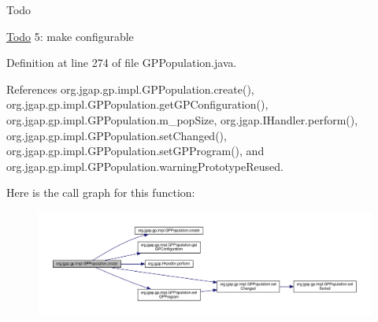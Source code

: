 \begin{DoxyRefDesc}{Todo}
\item[\hyperlink{todo__todo000156}{Todo}]5\-: make configurable \end{DoxyRefDesc}


Definition at line 274 of file G\-P\-Population.\-java.



References org.\-jgap.\-gp.\-impl.\-G\-P\-Population.\-create(), org.\-jgap.\-gp.\-impl.\-G\-P\-Population.\-get\-G\-P\-Configuration(), org.\-jgap.\-gp.\-impl.\-G\-P\-Population.\-m\-\_\-pop\-Size, org.\-jgap.\-I\-Handler.\-perform(), org.\-jgap.\-gp.\-impl.\-G\-P\-Population.\-set\-Changed(), org.\-jgap.\-gp.\-impl.\-G\-P\-Population.\-set\-G\-P\-Program(), and org.\-jgap.\-gp.\-impl.\-G\-P\-Population.\-warning\-Prototype\-Reused.



Here is the call graph for this function\-:
\nopagebreak
\begin{figure}[H]
\begin{center}
\leavevmode
\includegraphics[width=350pt]{classorg_1_1jgap_1_1gp_1_1impl_1_1_g_p_population_a21670302d6d9c5ad4bdc2903797eabff_cgraph}
\end{center}
\end{figure}


